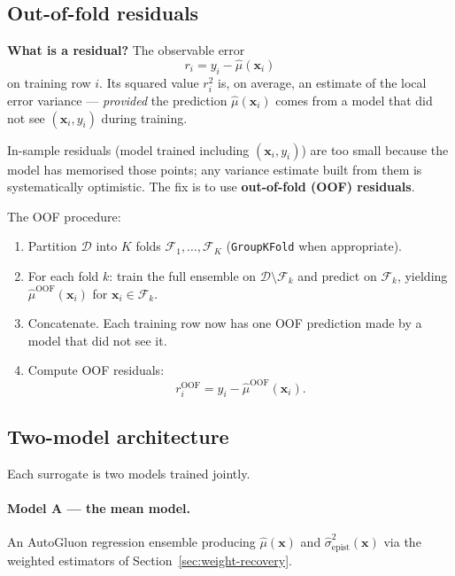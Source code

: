 \documentclass[11pt,a4paper]{article}
\begin{document}
\subsection{Out-of-fold residuals}
\label{sec:oof}

\begin{recapbox}
\textbf{What is a residual?} The observable error
\[
r_i = y_i - \hat\mu(\bm x_i)
\]
on training row $i$. Its squared value $r_i^2$ is, on average, an estimate of the local error variance --- \emph{provided} the prediction $\hat\mu(\bm x_i)$ comes from a model that did not see $(\bm x_i, y_i)$ during training.
\end{recapbox}

\begin{cautionbox}
In-sample residuals (model trained including $(\bm x_i, y_i)$) are too small because the model has memorised those points; any variance estimate built from them is systematically optimistic. The fix is to use \textbf{out-of-fold (OOF) residuals}.
\end{cautionbox}

The OOF procedure:
\begin{enumerate}
    \item Partition $\mathcal{D}$ into $K$ folds $\mathcal{F}_1, \ldots, \mathcal{F}_K$ (\texttt{GroupKFold} when appropriate).
    \item For each fold $k$: train the full ensemble on $\mathcal{D} \setminus \mathcal{F}_k$ and predict on $\mathcal{F}_k$, yielding $\hat\mu^{\text{OOF}}(\bm x_i)$ for $\bm x_i \in \mathcal{F}_k$.
    \item Concatenate. Each training row now has one OOF prediction made by a model that did not see it.
    \item Compute OOF residuals:
    \begin{equation}
    r_i^{\text{OOF}} = y_i - \hat\mu^{\text{OOF}}(\bm x_i).
    \label{eq:oof-residuals}
    \end{equation}
\end{enumerate}

\subsection{Two-model architecture}
\label{sec:two-model-architecture}

Each surrogate is two models trained jointly.

\paragraph{Model A --- the mean model.} An AutoGluon regression ensemble producing $\hat\mu(\bm x)$ and $\hat\sigma^2_{\text{epist}}(\bm x)$ via the weighted estimators of Section~\ref{sec:weight-recovery}.
\end{document}
